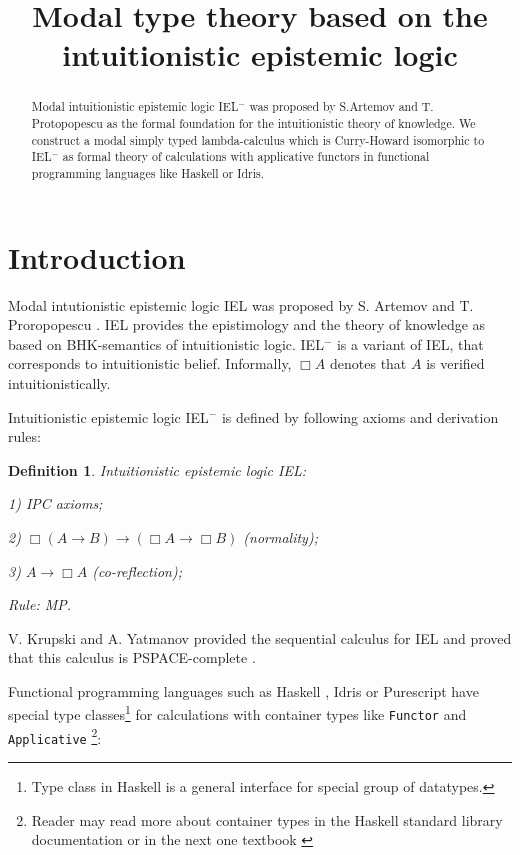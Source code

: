\documentclass[a4paper]{article}
\date{}
\title{Modal type theory based on the intuitionistic epistemic logic}
\newtheorem{defin}{Definition}
\begin{document}
\maketitle

\begin{abstract}
Modal intuitionistic epistemic logic IEL$^{-}$ was proposed by S.Artemov and T. Protopopescu as the formal
foundation for the intuitionistic theory of knowledge. We construct a modal simply typed lambda-calculus
which is Curry-Howard isomorphic to IEL$^{-}$ as formal theory of calculations with applicative functors in
functional programming languages like Haskell or Idris.
\end{abstract}


  \section{Introduction}

  Modal intutionistic epistemic logic IEL was proposed by S. Artemov and T. Proropopescu \cite{Artemov}. IEL
  provides the epistimology and the theory of knowledge as based on BHK-semantics of intuitionistic logic.
  IEL$^{-}$  is a variant of IEL, that corresponds to intuitionistic belief.
  Informally, $\Box A$ denotes that $A$ is verified intuitionistically.

  Intuitionistic epistemic logic IEL$^{-}$ is defined by following axioms and derivation rules:

  \begin{defin} Intuitionistic epistemic logic IEL:

    1) IPC axioms;

    2) $\Box (A \to B) \to (\Box A \to \Box B)$ (normality);

    3) $A \to \Box A$ (co-reflection);

    Rule: MP.

  \end{defin}

  V. Krupski and  A. Yatmanov provided the sequential calculus for IEL and proved that this calculus is
  PSPACE-complete \cite{Krupski}.

  Functional programming languages such as Haskell \cite{Haskell}, Idris \cite{Idris} or Purescript \cite{Purs}
  have special type classes\footnote{Type class in Haskell is a general interface for
  special group of datatypes.} for calculations with container types like \verb"Functor" and
  \verb"Applicative" \footnote{Reader may read more about container types in the Haskell standard library documentation\cite{Base} or in the next one textbook
  \cite{Miran}}:
\end{document}
